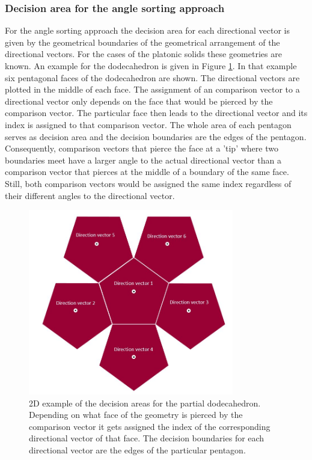 \subsubsection{Decision area for the angle sorting approach}

For the angle sorting approach the decision area for each directional vector is given by the geometrical boundaries of the geometrical arrangement of the directional vectors. For the cases of the platonic solids these geometries are known. An example for the dodecahedron is given in Figure \ref{decision_area_dodeca}. In that example six pentagonal faces of the dodecahedron are shown. The directional vectors are plotted in the middle of each face. The assignment of an comparison vector to a directional vector only depends on the face that would be pierced by the comparison vector. The particular face then leads to the directional vector and its index is assigned to that comparison vector. The whole area of each pentagon serves as decision area and the decision boundaries are the edges of the pentagon. Consequently, comparison vectors that pierce the face at a 'tip' where two boundaries meet have a larger angle to the actual directional vector than a comparison vector that pierces at the middle of a boundary of the same face. Still, both comparison vectors would be assigned the same index regardless of their different angles to the directional vector.



\begin{figure}[H]
    \centering
    \includegraphics[width=0.8\textwidth]{Graphics/decision_area_normal.jpg}
    \caption{2D example of the decision areas for the partial dodecahedron. Depending on what face of the geometry is pierced by the comparison vector it gets assigned the index of the corresponding directional vector of that face. The decision boundaries for each directional vector are the edges of the particular pentagon.}
    \label{decision_area_dodeca}
\end{figure}

